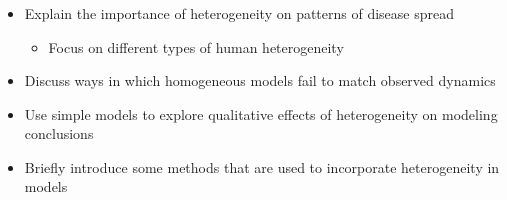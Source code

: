 \documentclass{beamer}
\begin{document}
\begin{frame}


\frametitle{}

\begin{itemize}

\item Explain the importance of heterogeneity on patterns of disease spread\begin{itemize}

\item Focus on different types of human heterogeneity\end{itemize}

\item Discuss ways in which homogeneous models fail to match observed
	dynamics

\item Use simple models to explore qualitative effects of heterogeneity on
	modeling conclusions

\item Briefly introduce some methods that are used to incorporate heterogeneity in
	models\end{itemize}
\end{frame}
\end{document}
